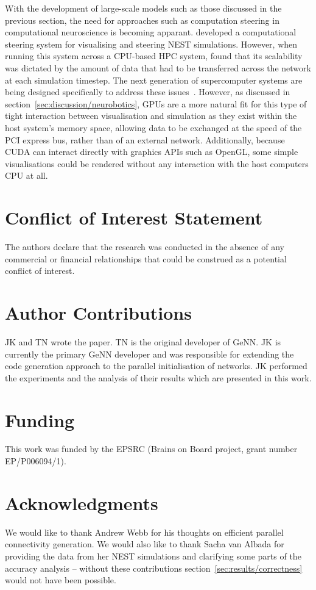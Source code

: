 \documentclass[utf8]{frontiersSCNS} %
\begin{document}
With the development of large-scale models such as those discussed in the previous section, the need for approaches such as computation steering in computational neuroscience is becoming apparant.
\citet{Nowke2018} developed a computational steering system for visualising and steering NEST simulations.
However, when running this system across a CPU-based HPC system, \citeauthor{Nowke2018} found that its scalability was dictated by the amount of data that had to be transferred across the network at each simulation timestep.
The next generation of supercomputer systems are being designed specifically to address these issues~\citep{Lippert2014}.
However, as discussed in section~\ref{sec:discussion/neurobotics}, GPUs are a more natural fit for this type of tight interaction between visualisation and simulation as they exist within the host system's memory space, allowing data to be exchanged at the speed of the PCI express bus, rather than of an external network.
Additionally, because CUDA can interact directly with graphics APIs such as OpenGL, some simple visualisations could be rendered without any interaction with the host computers CPU at all.

\section*{Conflict of Interest Statement}
The authors declare that the research was conducted in the absence of any commercial or financial relationships that could be construed as a potential conflict of interest.

\section*{Author Contributions}
JK and TN wrote the paper.
TN is the original developer of GeNN.
JK is currently the primary GeNN developer and was responsible for extending the code generation approach to the parallel initialisation of networks.
JK performed the experiments and the analysis of their results which are presented in this work.

\section*{Funding}
This work was funded by the EPSRC (Brains on Board project, grant number EP/P006094/1).

\section*{Acknowledgments}
We would like to thank Andrew Webb for his thoughts on efficient parallel connectivity generation.
We would also like to thank Sacha van Albada for providing the data from her NEST simulations and clarifying some parts of the accuracy analysis -- without these contributions section~\ref{sec:results/correctness} would not have been possible.
\end{document}
